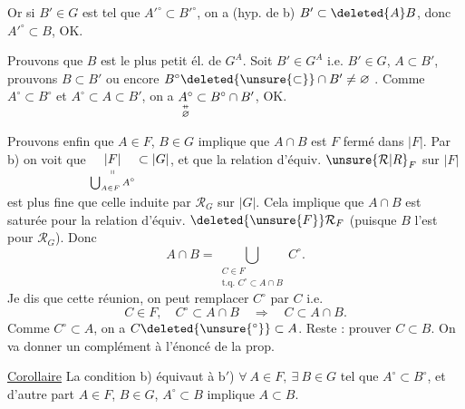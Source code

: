 Or si $B'\in G$ est tel que $A'^\circ\subset B'^\circ$, on a  (hyp. de b) $B'\subset \deleted{A}B$, donc $A'^\circ\subset B$, OK.

Prouvons que $B$ est le plus petit él. de $G^A$. Soit $B'\in G^A$ i.e. $B'\in G$, $A\subset B'$, prouvons $B\subset B'$ ou encore $B^\circ\deleted{\unsure{\subset}}\cap B'\ne\varnothing$ . Comme
$A^\circ\subset B^\circ$ et $A^\circ\subset A\subset B'$, on a $\underset{\substack{\mathrel{\ooalign{\hfil$\scriptstyle\shortparallel$\hfil\cr\hfil$\scriptstyle-$\hfil\cr}}\\ \varnothing}}{A^\circ}\subset B^\circ\cap B'$, OK.

Prouvons enfin que $A\in F$, $B\in G$ implique que $A\cap B$ est $F$ fermé dans $|F|$. Par b) on voit que $\underset{\substack{\shortparallel\\ \bigcup_{A\in F}A^\circ}}{|F|}\subset|G|$, et que
la relation d'équiv. $\unsure{\mathcal R|R}_F$ sur $|F|$ est plus fine que celle induite par $\mathcal R_G$ sur $|G|$. Cela implique que $A\cap B$ est saturée pour la relation d'équiv. $\deleted{\unsure{F}}\mathcal R_F$ (puisque $B$ l'est pour $\mathcal R_G$). Donc
\[ A\cap B=\bigcup_{\substack{C\in F\\ \text{t.q. } C^\circ\subset A\cap B}} C^\circ . \]
Je dis que  cette réunion,  on peut remplacer $C^\circ$ par $C$ i.e.
\[ C\in F,\quad C^\circ\subset A\cap B\quad\Longrightarrow\quad C\subset A\cap B. \]
Comme $C^\circ\subset A$, on a $C\deleted{\unsure{{}^\circ}}\subset A$. Reste : prouver $C\subset B$. On va donner un complément  à l'énoncé de la prop.

\uline{Corollaire} La condition b) équivaut à
$\mathrm{b}'$) $\forall\ A\in F,\ \exists\ B\in G$ tel que $A^\circ\subset B^\circ$, et d'autre part $A\in F$, $B\in G$, $A^\circ\subset B$ implique $A\subset B$.
